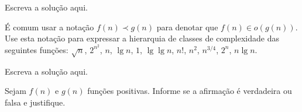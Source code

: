\documentclass[a4paper]{exam}
\begin{document}
\begin{questions}
  \begin{solution}
    Escreva a solução aqui.
  \end{solution}
  \question É comum usar a notação $f(n) \prec g(n)$ para denotar que
  $f(n) \in o(g(n))$. Use esta notação para expressar a
  hierarquia de classes de complexidade das seguintes funções:
  $\sqrt{n}$, $2^{n^2}$, $n$, $\lg n$, $1$, $\lg \lg n$, $n!$, $n^2$, $n^{3/4}$, $2^n$, $n \lg n$.
  \begin{solution}
    Escreva a solução aqui.
  \end{solution}
  
  
  \question Sejam $f(n)$ e $g(n)$ funções positivas. Informe se a
  afirmação é verdadeira ou falsa e justifique.
\end{questions}
\end{document}
